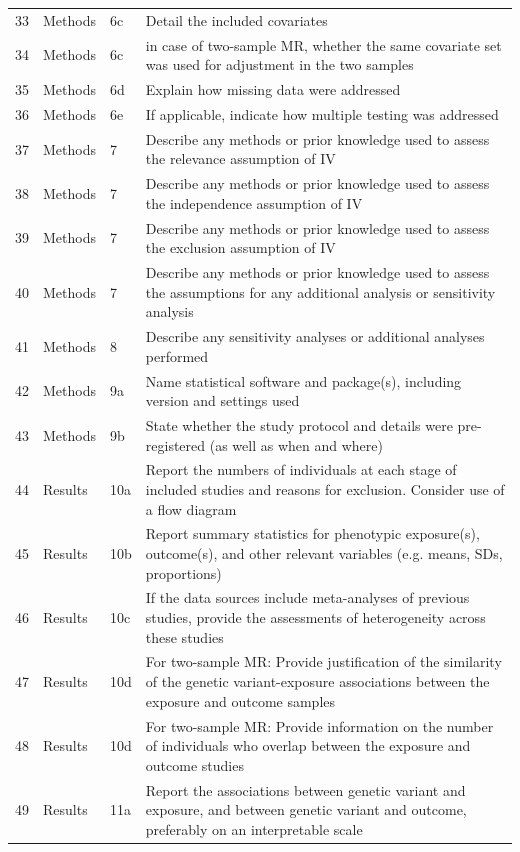 \begin{longtable}{@{}lll p{9cm}@{}}
33 & Methods & 6c & Detail the included covariates \\
34 & Methods & 6c & in case of two-sample MR, whether the same covariate set was used for adjustment in the two samples \\
35 & Methods & 6d & Explain how missing data were addressed \\
36 & Methods & 6e & If applicable, indicate how multiple testing was addressed \\
37 & Methods & 7 & Describe any methods or prior knowledge used to assess the relevance assumption of IV \\
38 & Methods & 7 & Describe any methods or prior knowledge used to assess the independence  assumption of IV \\
39 & Methods & 7 & Describe any methods or prior knowledge used to assess the exclusion assumption of IV \\
40 & Methods & 7 & Describe any methods or prior knowledge used to assess the assumptions for any additional analysis or sensitivity analysis \\
41 & Methods & 8 & Describe any sensitivity analyses or additional analyses performed \\
42 & Methods & 9a & Name statistical software and package(s), including version and settings used \\
43 & Methods & 9b & State whether the study protocol and details were pre-registered (as well as when and where) \\
44 & Results & 10a & Report the numbers of individuals at each stage of included studies and reasons for exclusion. Consider use of a flow diagram \\
45 & Results & 10b & Report summary statistics for phenotypic exposure(s), outcome(s), and other relevant variables (e.g. means, SDs, proportions) \\
46 & Results & 10c & If the data sources include meta-analyses of previous studies, provide the assessments of heterogeneity across these studies \\
47 & Results & 10d & For two-sample MR: Provide justification of the similarity of the genetic variant-exposure associations between the exposure and outcome samples \\
48 & Results & 10d & For two-sample MR: Provide information on the number of individuals who overlap between the exposure and outcome studies \\
49 & Results & 11a & Report the associations between genetic variant and exposure, and between genetic variant and outcome, preferably on an interpretable scale \\

\end{longtable}
